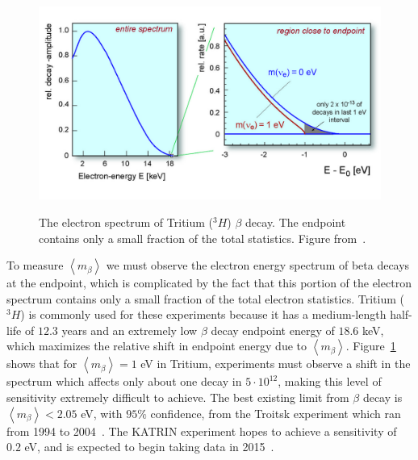 \begin{figure}
\begin{center}
\includegraphics[keepaspectratio=true,width=\textwidth]{TritiumSpectrum.jpg}
\end{center}
\renewcommand{\baselinestretch}{1}
\small\normalsize
\begin{quote}
\caption{The electron spectrum of Tritium ($^3H$) $\beta$ decay.  The endpoint contains only a small fraction of the total statistics.  Figure from~\cite{Angrik:2005ep}.}
\label{fig:TritiumSpectrum}
\end{quote}
\end{figure}
\renewcommand{\baselinestretch}{2}
\small\normalsize

To measure $\left< m_\beta \right>$ we must observe the electron energy spectrum of beta decays at the endpoint, which is complicated by the fact that this portion of the electron spectrum contains only a small fraction of the total electron statistics.  Tritium ($^3H$) is commonly used for these experiments because it has a medium-length half-life of $12.3$ years and an extremely low $\beta$ decay endpoint energy of $18.6$ keV, which maximizes the relative shift in endpoint energy due to $\left< m_\beta \right>$.  Figure~\ref{fig:TritiumSpectrum} shows that for $\left< m_\beta \right> = 1$ eV in Tritium, experiments must observe a shift in the spectrum which affects only about one decay in $5 \cdot 10^{12}$, making this level of sensitivity extremely difficult to achieve.  The best existing limit from $\beta$ decay is $\left<m_\beta\right> < 2.05$ eV, with $95\%$ confidence, from the Troitsk experiment which ran from 1994 to 2004~\cite{OldTritium}.  The KATRIN experiment hopes to achieve a sensitivity of $0.2$ eV, and is expected to begin taking data in 2015~\cite{NewTritium,NewTritiumTimeline}.

